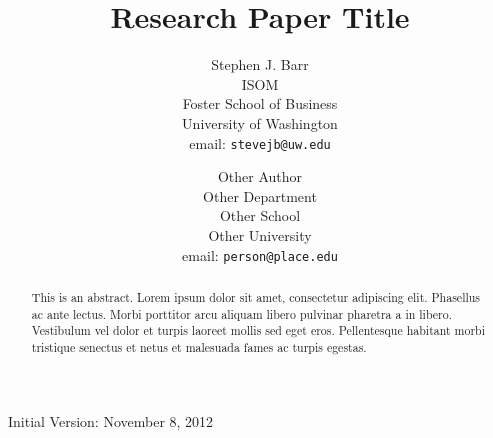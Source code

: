 \documentclass[11pt]{article}
\title{Research Paper Title}
\author{
  Stephen J. Barr \\
  ISOM \\
  Foster School of Business \\
  University of Washington \\
  email: \texttt{stevejb@uw.edu}
  \and
  Other Author \\
  Other Department\\
  Other School \\
  Other University \\ 
  email: \texttt{person@place.edu}
}
\numberwithin{equation}{section}
\begin{document}
\date{}
\maketitle
\begin{center}
  Initial Version: November 8, 2012
\end{center}


\begin{abstract}
This is an abstract. Lorem ipsum dolor sit amet, consectetur adipiscing elit. Phasellus ac ante lectus. Morbi porttitor arcu aliquam libero pulvinar pharetra a in libero. Vestibulum vel dolor et turpis laoreet mollis sed eget eros. Pellentesque habitant morbi tristique senectus et netus et malesuada fames ac turpis egestas. 
\end{abstract}













\end{document}
